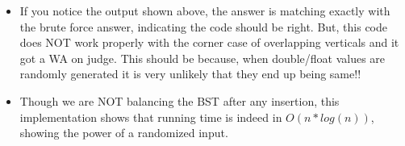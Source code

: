 \documentclass{article}
\begin{document}
\begin{itemize}
\begin{center}
\end{center}
\item If you notice the output shown above, the answer is matching exactly with the brute force answer, indicating the code should be right. But, this code does NOT work properly with the corner case of overlapping verticals and it got a WA on judge. This should be because, when double/float values are randomly generated it is very unlikely that they end up being same!!
\item Though we are NOT balancing the BST after any insertion, this implementation shows that running time is indeed in $O(n*log(n))$, showing the power of a randomized input. 
\end{itemize}
\end{document}
